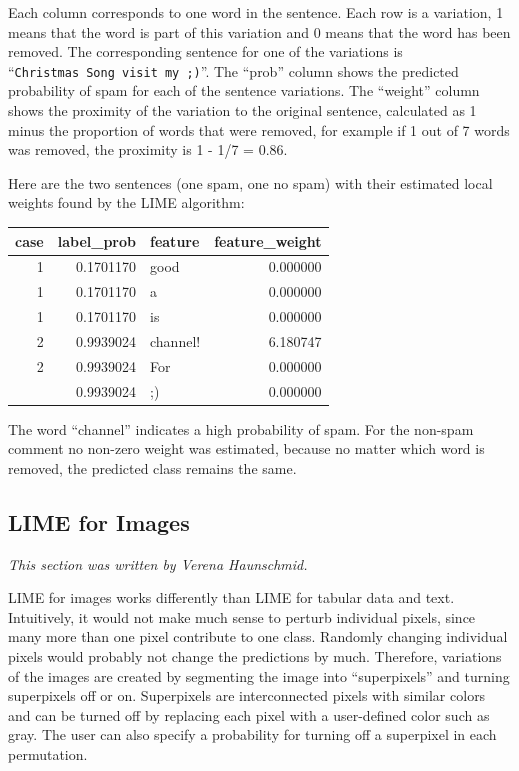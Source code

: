\documentclass[
  11pt,
]{scrbook}
\begin{document}
Each column corresponds to one word in the sentence.
Each row is a variation, 1 means that the word is part of this variation and 0 means that the word has been removed.
The corresponding sentence for one of the variations is ``\texttt{Christmas\ Song\ visit\ my\ ;)}''.
The ``prob'' column shows the predicted probability of spam for each of the sentence variations.
The ``weight'' column shows the proximity of the variation to the original sentence, calculated as 1 minus the proportion of words that were removed, for example if 1 out of 7 words was removed, the proximity is 1 - 1/7 = 0.86.

Here are the two sentences (one spam, one no spam) with their estimated local weights found by the LIME algorithm:

\begin{table}
\centering
\begin{tabular}{rrlr}
\toprule
case & label\_prob & feature & feature\_weight\\
\midrule
1 & 0.1701170 & good & 0.000000\\
1 & 0.1701170 & a & 0.000000\\
1 & 0.1701170 & is & 0.000000\\
2 & 0.9939024 & channel! & 6.180747\\
2 & 0.9939024 & For & 0.000000\\
\addlinespace
2 & 0.9939024 & ;) & 0.000000\\
\bottomrule
\end{tabular}
\end{table}

The word ``channel'' indicates a high probability of spam.
For the non-spam comment no non-zero weight was estimated, because no matter which word is removed, the predicted class remains the same.

\hypertarget{images-lime}{%
\subsection{LIME for Images}\label{images-lime}}

\emph{This section was written by Verena Haunschmid.}

LIME for images works differently than LIME for tabular data and text.
Intuitively, it would not make much sense to perturb individual pixels, since many more than one pixel contribute to one class.
Randomly changing individual pixels would probably not change the predictions by much.
Therefore, variations of the images are created by segmenting the image into ``superpixels'' and turning superpixels off or on.
Superpixels are interconnected pixels with similar colors and can be turned off by replacing each pixel with a user-defined color such as gray.
The user can also specify a probability for turning off a superpixel in each permutation.
\end{document}
